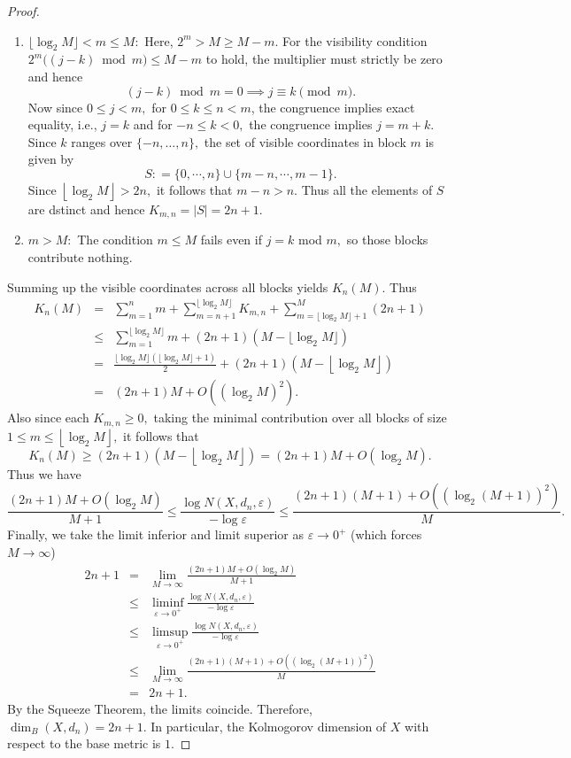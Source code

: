 \documentclass[a4paper,11pt,reqno]{amsart}
\theoremstyle{plain}
\theoremstyle{mainthmstyle}
\theoremstyle{named}
\numberwithin{equation}{section}
\newcommand{\Bea}{\begin{eqnarray*}}
\newcommand{\Eea}{\end{eqnarray*}}
\begin{document}
\begin{proof}
\begin{enumerate}
\item $\lfloor \log_2 M \rfloor < m \leq M:$
Here, $2^m > M \ge M - m$. For the visibility condition $2^m \big((j - k) \bmod m\big) \le M - m$ to hold, the multiplier must strictly be zero and hence $$(j - k) \bmod m = 0 \implies j \equiv k \pmod m.$$ Now since $0 \leq j < m,$ for $0 \leq k \leq n < m$, the congruence implies exact equality, i.e., $j = k$ and for $- n \leq k < 0,$ the congruence implies $j = m + k.$ Since $k$ ranges over $\{- n, \dots, n\},$ the set of visible coordinates in block $m$ is given by $$S : = \{0, \cdots, n \} \cup \{m - n, \cdots, m - 1 \}.$$
Since $\left \lfloor \log_2 M \right \rfloor > 2 n,$ it follows that $m - n > n.$ Thus all the elements of $S$ are dstinct and hence $K_{m, n} = \left \lvert S \right \rvert = 2 n + 1.$ 
    
\item $m > M :$ The condition $m \le M$ fails even if $j=k$ mod $m,$ so those blocks contribute nothing.  
\end{enumerate}

\vspace{2mm}

Summing up the visible coordinates across all blocks yields $K_n(M).$ Thus
\Bea
K_n(M) & = & \sum_{m=1}^{n} m + \sum_{m = n + 1}^{\lfloor \log_2 M \rfloor} K_{m,n} + \sum_{m=\lfloor \log_2 M \rfloor + 1}^M (2 n + 1) \\ & \leq & \sum\limits_{m = 1}^{\lfloor \log_2 M \rfloor} m + (2 n + 1) \left (M - \lfloor \log_2 M \rfloor \right ) \\ & = & \frac {\lfloor \log_2 M \rfloor \left (\lfloor \log_2 M \rfloor + 1 \right )} {2} + (2 n + 1) \left (M - \left \lfloor \log_2 M \right \rfloor \right ) \\ & = & (2 n + 1) M + O \left ((\log_2 M)^2 \right ).
\Eea
Also since each $K_{m, n} \geq 0,$ taking the minimal contribution over all blocks of size $1 \leq m \leq \left \lfloor \log_2 M \right \rfloor,$ it follows that $$K_n (M) \geq (2 n + 1) \left (M - \left \lfloor \log_2 M \right \rfloor \right ) = (2 n + 1) M + O \left (\log_2 M \right ).$$
Thus we have
$$\frac{(2 n + 1) M + O \left (\log_2 M \right )}{M+1} \le \frac{\log N(X, d_n, \varepsilon)}{-\log \varepsilon} \le \frac{(2 n + 1) (M+1) + O((\log_2(M+1))^2)}{M}.$$
Finally, we take the limit inferior and limit superior as $\varepsilon \to 0^+$ (which forces $M \to \infty$)
\Bea
2 n + 1 & = & \lim_{M \to \infty} \frac{(2 n + 1) M + O \left (\log_2 M \right )}{M+1} \\ & \leq & \liminf_{\varepsilon \to 0^+} \frac{\log N(X, d_n, \varepsilon)}{-\log \varepsilon} \\
& \leq & \limsup_{\varepsilon \to 0^+} \frac{\log N(X, d_n, \varepsilon)}{-\log \varepsilon} \\ & \leq & \lim_{M \to \infty} \frac{(2 n + 1) (M+1) + O \left (\left (\log_2 (M + 1) \right )^{2} \right )}{M} \\ & = & 2 n + 1.
\Eea
By the Squeeze Theorem, the limits coincide. Therefore, $\dim_B(X, d_n) = 2 n + 1.$ In particular, the Kolmogorov dimension of $X$ with respect to the base metric is $1$.
\end{proof}
\end{document}
